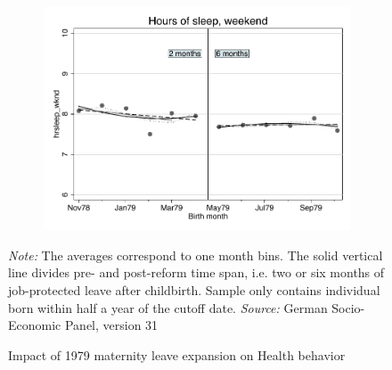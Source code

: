 \documentclass[a4paper ]{article}
\begin{document}
\begin{figure}[p]
\begin{subfigure}[h]{0.48\textwidth}\centering
	\includegraphics[width=\textwidth]{../../analysis/graphs/SOEP/hrsleep_wknd_RD.pdf}
\end{subfigure}


\caption{Impact of 1979 maternity leave expansion on Health behavior}\label{fig: RD_HB}
\begin{minipage}{\textwidth} %
{\footnotesize \textit{Note:} The averages correspond to one month bins. The solid vertical line divides pre- and post-reform time span, i.e. two or six months of job-protected leave after childbirth. Sample only contains individual born within half a year of the cutoff date. \newline \textit{Source: }German Socio-Economic Panel, version 31\par}
\end{minipage}
\end{figure}
\end{document}
